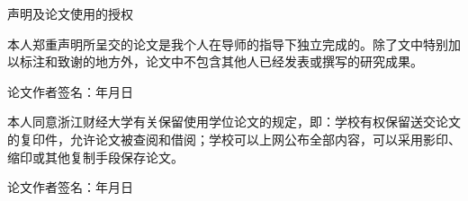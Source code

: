 

\pagestyle{originality}


\setlength{\parskip}{0.4em}
\renewcommand{\baselinestretch}{1.41}

\vspace*{-6mm}

\begin{center}
  \heiti{}\textmd{声明及论文使用的授权}
\end{center}

\vspace{10mm}



本人郑重声明所呈交的论文是我个人在导师的指导下独立完成的。除了文中特别加以标注和致谢的地方外，论文中不包含其他人已经发表或撰写的研究成果。

\vspace{15mm}

\begin{flushright}
  论文作者签名：\hspace{75mm}年\hspace{8mm}月\hspace{8mm}日
\end{flushright}

\vspace{40mm}



本人同意浙江财经大学有关保留使用学位论文的规定，即：学校有权保留送交论文的复印件，允许论文被查阅和借阅；学校可以上网公布全部内容，可以采用影印、缩印或其他复制手段保存论文。

\vspace*{15mm}

\begin{flushright}
  论文作者签名：\hspace{75mm}年\hspace{8mm}月\hspace{8mm}日
\end{flushright}

\newpage

